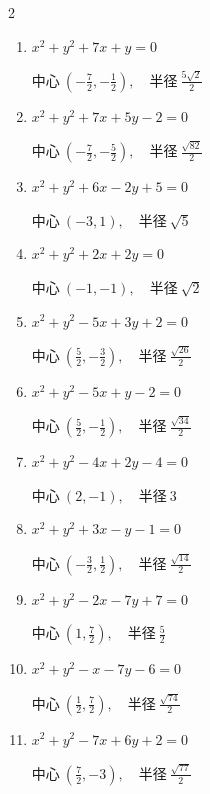 \begin{multicols}{2}
\begin{enumerate}
  \item $x^{2}+y^{2}+7x+y=0$

        $\displaystyle 中心\: \left(-\frac{7}{2},-\frac{1}{2}\right), \quad 半径 \ \frac{5\sqrt{2}}{2}$

  \item $x^{2}+y^{2}+7x+5y-2=0$

        $\displaystyle 中心\: \left(-\frac{7}{2},-\frac{5}{2}\right), \quad 半径 \ \frac{\sqrt{82}}{2}$

  \item $x^{2}+y^{2}+6x-2y+5=0$

        $\displaystyle 中心\: \left(-3,1\right), \quad 半径 \ \sqrt{5}$

  \item $x^{2}+y^{2}+2x+2y=0$

        $\displaystyle 中心\: \left(-1,-1\right), \quad 半径 \ \sqrt{2}$

  \item $x^{2}+y^{2}-5x+3y+2=0$

        $\displaystyle 中心\: \left(\frac{5}{2},-\frac{3}{2}\right), \quad 半径 \ \frac{\sqrt{26}}{2}$

  \item $x^{2}+y^{2}-5x+y-2=0$

        $\displaystyle 中心\: \left(\frac{5}{2},-\frac{1}{2}\right), \quad 半径 \ \frac{\sqrt{34}}{2}$

  \item $x^{2}+y^{2}-4x+2y-4=0$

        $\displaystyle 中心\: \left(2,-1\right), \quad 半径 \ 3$

  \item $x^{2}+y^{2}+3x-y-1=0$

        $\displaystyle 中心\: \left(-\frac{3}{2},\frac{1}{2}\right), \quad 半径 \ \frac{\sqrt{14}}{2}$

  \item $x^{2}+y^{2}-2x-7y+7=0$

        $\displaystyle 中心\: \left(1,\frac{7}{2}\right), \quad 半径 \ \frac{5}{2}$

  \item $x^{2}+y^{2}-x-7y-6=0$

        $\displaystyle 中心\: \left(\frac{1}{2},\frac{7}{2}\right), \quad 半径 \ \frac{\sqrt{74}}{2}$

  \item $x^{2}+y^{2}-7x+6y+2=0$

        $\displaystyle 中心\: \left(\frac{7}{2},-3\right), \quad 半径 \ \frac{\sqrt{77}}{2}$


\end{enumerate}
\end{multicols}
